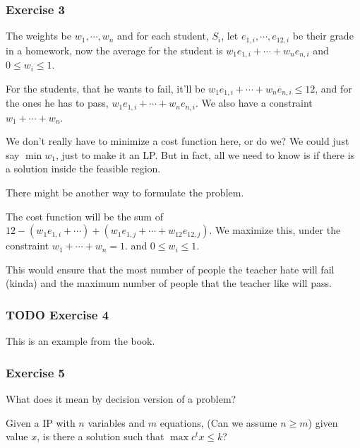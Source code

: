 \documentclass[11pt]{article}
\def\max{\operatorname{max}}
\def\min{\operatorname{min}}
\begin{document}
\subsubsection{Exercise 3}
\label{sec:org06962d0}
The weights be \(w_1, \cdots, w_n\) and for each student, \(S_i\), let \(e_{1,i},
    \cdots, e_{12,i}\) be their grade in a homework, now the average for the
student is \(w_1e_{1, i} + \cdots + w_ne_{n, i}\) and \(0 \le w_i \le 1\).

For the students, that he wants to fail, it'll be \(w_1e_{1, i} + \cdots +
    w_ne_{n, i} \le 12\), and for the ones he has to pass, \(w_1e_{1, i} +
    \cdots + w_ne_{n, i}\). We also have a constraint \(w_1 + \cdots + w_n\).

We don't really have to minimize a cost function here, or do we? We could
just say \(\min w_1\), just to make it an LP. But in fact, all we need to know
is if there is a solution inside the feasible region.


There might be another way to formulate the problem.

The cost function will be the sum of \(12 - (w_1 e_{1, i} + \cdots ) + (w_1
    e_{1, j} + \cdots + w_{12} e_{12, j})\). We maximize this, under the
constraint \(w_1 + \cdots + w_n = 1\). and \(0 \le w_i \le 1\).

This would ensure that the most number of people the teacher hate will fail
(kinda) and the maximum number of people that the teacher like will pass.
\subsubsection{{\bfseries\sffamily TODO} Exercise 4}
\label{sec:org62563f0}
This is an example from the book.
\subsubsection{Exercise 5}
\label{sec:org68b9e77}
What does it mean by decision version of a problem?

Given a IP with \(n\) variables and \(m\) equations, (Can we assume \(n \ge m\))
given value \(x\), is there a solution such that \(\max c^t x \le k\)?
\end{document}
